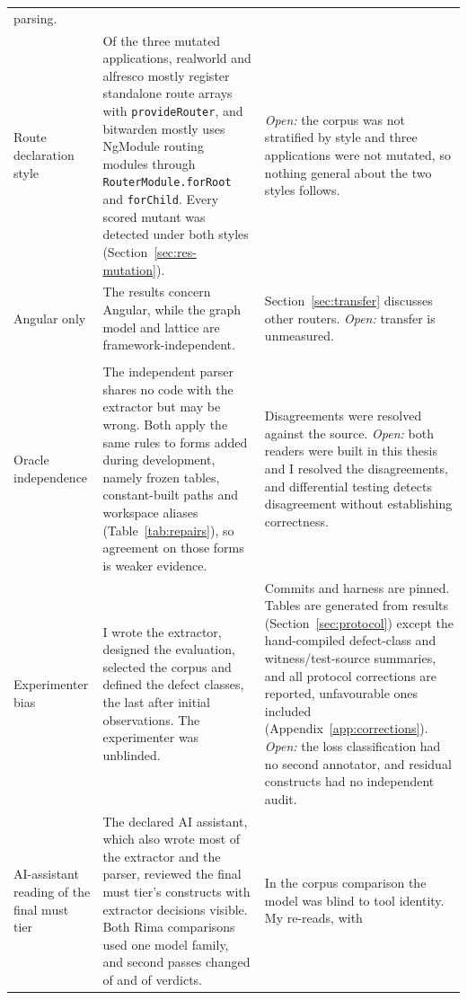 \begin{xltabular}{\textwidth}{@{}>{\raggedright\arraybackslash}p{2.4cm}YY@{}}
parsing. \\
Route declaration style
& Of the three mutated applications, realworld and alfresco mostly register standalone route arrays
with \texttt{provideRouter}, and bitwarden mostly uses NgModule routing modules through
\texttt{RouterModule.forRoot} and \texttt{forChild}. Every scored mutant was detected under both
styles (Section~\ref{sec:res-mutation}).
& \emph{Open:} the corpus was not stratified by style and three applications were not mutated, so
nothing general about the two styles follows. \\
Angular only
& The results concern Angular, while the graph model and lattice are framework-independent.
& Section~\ref{sec:transfer} discusses other routers. \emph{Open:} transfer is unmeasured. \\
\addlinespace[2pt]
\\
\addlinespace[2pt]
Oracle independence
& The independent parser shares no code with the extractor but may be wrong. Both apply the same
rules to forms added during development, namely frozen tables, constant-built paths and workspace
aliases (Table~\ref{tab:repairs}), so agreement on those forms is weaker evidence.
& Disagreements were resolved against the source. \emph{Open:} both readers were built in this thesis and I resolved the
disagreements, and differential testing detects disagreement without establishing correctness. \\
Experimenter bias
& I wrote the extractor, designed the evaluation, selected the corpus and defined the defect classes,
the last after initial observations. The experimenter was unblinded.
& Commits and harness are pinned. Tables are generated from results (Section~\ref{sec:protocol})
except the hand-compiled defect-class and witness/test-source summaries, and all protocol
corrections are reported, unfavourable ones included (Appendix~\ref{app:corrections}). \emph{Open:}
the loss classification had no second annotator, and residual constructs had no independent audit. \\
AI-assistant reading of the final must tier
& The declared AI assistant, which also wrote most of the extractor and the
parser, reviewed the final must tier's \CensusMustSites{} constructs with extractor decisions
visible. Both Rima comparisons used one model family, and second passes changed \RimaGateChanged{}
of \RimaGated{} and \HHGateChanged{} of \HHGated{} verdicts.
& In the corpus comparison the model was blind to tool identity. My \HHAuthorSample{} re-reads, with

\end{xltabular}
